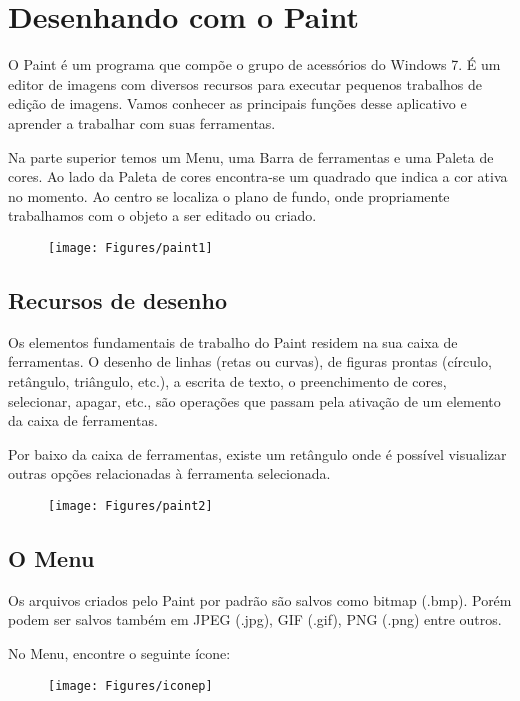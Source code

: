 \documentclass[hidelinks,12pt]{article}
\begin{document}
\section{Desenhando com o Paint}

O Paint é um programa que compõe o grupo de acessórios do Windows 7. É um editor de imagens com diversos recursos para executar pequenos trabalhos de edição de imagens. Vamos conhecer as principais funções desse aplicativo e aprender a trabalhar com suas ferramentas.

Na parte superior temos um Menu, uma Barra de ferramentas e uma Paleta de cores. Ao lado da Paleta de cores encontra-se um quadrado que indica a cor ativa no momento. Ao centro se localiza o plano de fundo, onde propriamente trabalhamos com o objeto a ser editado ou criado.

\begin{figure}[!h]
	\centering
	\texttt{[image: Figures/paint1]}
	\label{fig:paint1}
\end{figure}

\subsection{Recursos de desenho}

Os elementos fundamentais de trabalho do Paint residem na sua caixa de ferramentas. O desenho de linhas (retas ou curvas), de figuras prontas (círculo, retângulo, triângulo, etc.), a escrita de texto, o preenchimento de cores, selecionar, apagar, etc., são operações que passam pela ativação de um elemento da caixa de ferramentas.

Por baixo da caixa de ferramentas, existe um retângulo onde é possível visualizar outras opções relacionadas à ferramenta selecionada.


\begin{figure}[!h]
	\centering
	\texttt{[image: Figures/paint2]}
	\label{fig:paint2}
\end{figure}

\subsection{O Menu}

Os arquivos criados pelo Paint por padrão são salvos como bitmap (.bmp). Porém podem ser salvos também em JPEG (.jpg), GIF (.gif), PNG (.png) entre outros.

No Menu, encontre o seguinte ícone:

\begin{figure}[!h]
	\centering
	\texttt{[image: Figures/iconep]}
	\label{fig:paintp}
\end{figure}
\end{document}
